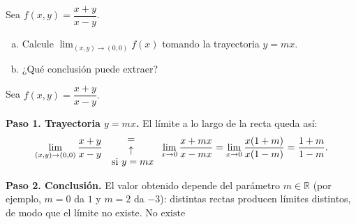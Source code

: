 \begin{prob}
Sea $f(x,y)=\dfrac{x+y}{x-y}.$
\begin{enumerate}[(a)]
    \item Calcule $\displaystyle\lim_{(x,y)\to (0,0)}f(x)$ tomando la trayectoria $y=mx.$
    \item ¿Qué conclusión puede extraer?
\end{enumerate}
\begin{myproof}
Sea $f(x,y)=\dfrac{x+y}{x-y}.$

\textbf{Paso 1. Trayectoria $y=mx$.} El límite a lo largo de la recta queda así:
\begin{align*}
\displaystyle\lim_{(x,y)\to (0,0)} \dfrac{x+y}{x-y} {{=}\atop {\begin{array}{c}
\uparrow\\ \text{ si $y=mx$}\end{array}} } \displaystyle\lim_{x\to 0}\dfrac{x+mx}{x-mx}=\displaystyle\lim_{x\to 0}\dfrac{x(1+m)}{x(1-m)}=\dfrac{1+m}{1-m}.
\end{align*}

\textbf{Paso 2. Conclusión.} El valor obtenido depende del parámetro $m\in\mathbb{R}$ (por ejemplo, $m=0$ da $1$ y $m=2$ da $-3$): distintas rectas producen límites distintos, de modo que el límite no existe.
$\boxed{\text{No existe}}$
\end{myproof}
\end{prob}

